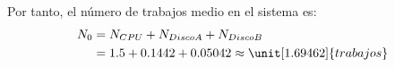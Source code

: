 \documentclass[12pt]{article}
\begin{document}
\begin{ejercicio}[2 puntos]
\begin{enumerate}
            Por tanto, el número de trabajos medio en el sistema es:
            \begin{align*}
                N_0 &= N_{CPU} + N_{Disco A} + N_{Disco B}\\
                &= 1.5 + 0.1442 + 0.05042 \approx \unit[1.69462]{trabajos}
            \end{align*}
        \end{enumerate}
    \end{ejercicio}
\end{document}
